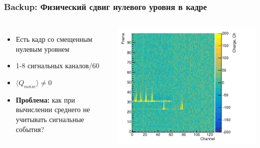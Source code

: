\documentclass[14pt]{beamer}
\begin{document}
\begin{frame}[t]
\frametitle{Backup: Физический сдвиг нулевого уровня в кадре}
\vspace{0pt}
\begin{columns}
\begin{minipage}[t][1\textheight]{\linewidth}
	\small{\begin{itemize}
			\item Есть кадр со смещенным нулевым уровнем
			\item 1-8 сигнальных каналов/60
			\item $\langle Q_{noise}\rangle \neq 0 $
			\item \textbf{Проблема:} как при вычислении среднего не учитывать сигнальные события?
	\end{itemize}}
\end{minipage}%
\begin{minipage}[t][1\textheight]{\linewidth}
	\hspace*{5pt}
	\centering\includegraphics[width=1.05\linewidth]{median_monitor.pdf}
	
	
\end{minipage}%
\end{columns}
\end{frame}
\end{document}
